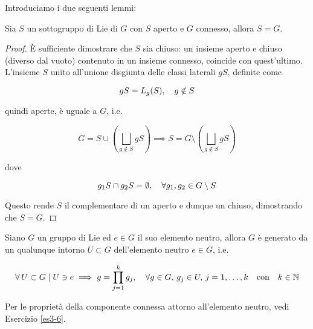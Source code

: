 Introduciamo i due seguenti lemmi:

\begin{lemma}
	Sia $ S $ un sottogruppo di Lie di $ G $ con $ S $ aperto e $ G $ connesso, allora $ S = G $.
\end{lemma}

\begin{proof}
	È sufficiente dimostrare che $ S $ sia chiuso: un insieme aperto e chiuso (diverso dal vuoto) contenuto in un insieme connesso, coincide con quest'ultimo.\\
	L'insieme $ S $ unito all'unione disgiunta delle classi laterali $ g S $, definite come
	
	\begin{equation}
		g S = L_{g}(S) \qcomma g \notin S
	\end{equation}
	
	quindi aperte, è uguale a $ G $, i.e.
	
	\begin{equation}
		G = S \cup \left( \bigsqcup_{g \notin S} g S \right) %
		\implies %
		S = G \setminus \left( \bigsqcup_{g \notin S} g S \right)
	\end{equation}
	
	dove
	
	\begin{equation}
		g_{1} S \cap g_{2} S = \emptyset %
		\qcomma \forall g_{1},g_{2} \in G \setminus S
	\end{equation}
	
	Questo rende $ S $ il complementare di un aperto e dunque un chiuso, dimostrando che $ S = G $.
\end{proof}

\begin{lemma}\label{lem:lie-gr-neut-int}
	Siano $ G $ un gruppo di Lie ed $ e \in G $ il suo elemento neutro, allora $ G $ è generato da un qualunque intorno $ U \subset G $ dell'elemento neutro $ e \in G $, i.e.
	
	\begin{equation}
		\forall \, U \subset G \mid U \ni e \implies g = \prod_{j=1}^{k} g_{j} %
		\qcomma \forall g \in G, \, g_{j} \in U, \, j=1,\dots,k %
		\qq{con} k \in \N
	\end{equation}
\end{lemma}

Per le proprietà della componente connessa attorno all'elemento neutro, vedi Esercizio \ref{es3-6}.

